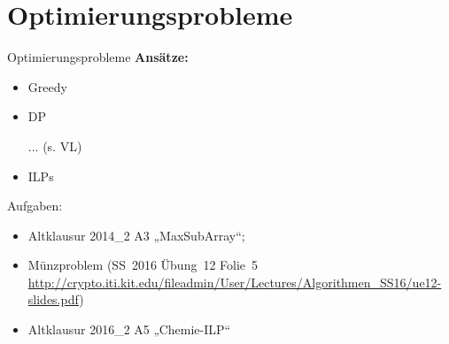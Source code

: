 \section{Optimierungsprobleme}

\begin{frame}{Optimierungsprobleme}
	\textbf{Ansätze:}
	\begin{itemize}
		\item Greedy
		\item DP
		\item[...] (s. VL)
		\item ILPs
	\end{itemize}
	\forcenewline
	{\small Aufgaben: 
		\begin{itemize}
			\item Altklausur 2014\_2 A3 „MaxSubArray“;
			\item Münzproblem (SS~2016 Übung~12 Folie~5 \\ {\footnotesize \url{http://crypto.iti.kit.edu/fileadmin/User/Lectures/Algorithmen\_SS16/ue12-slides.pdf}})
			\item Altklausur 2016\_2 A5 „Chemie-ILP“
		\end{itemize}
	}
\end{frame}



